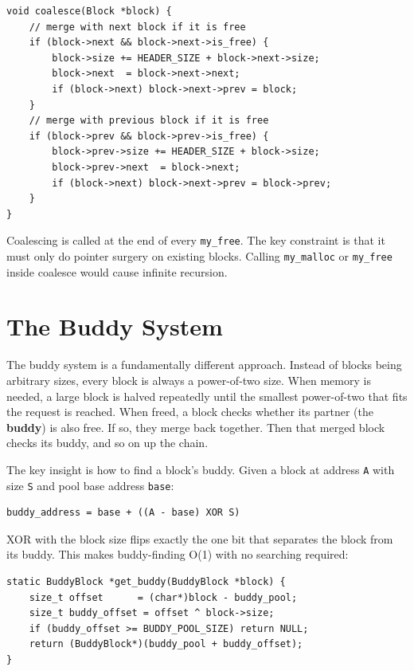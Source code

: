 \documentclass[12pt, a4paper]{report}
\begin{document}
\begin{lstlisting}
void coalesce(Block *block) {
    // merge with next block if it is free
    if (block->next && block->next->is_free) {
        block->size += HEADER_SIZE + block->next->size;
        block->next  = block->next->next;
        if (block->next) block->next->prev = block;
    }
    // merge with previous block if it is free
    if (block->prev && block->prev->is_free) {
        block->prev->size += HEADER_SIZE + block->size;
        block->prev->next  = block->next;
        if (block->next) block->next->prev = block->prev;
    }
}
\end{lstlisting}

Coalescing is called at the end of every \texttt{my\_free}. The key constraint
is that it must only do pointer surgery on existing blocks. Calling
\texttt{my\_malloc} or \texttt{my\_free} inside coalesce would cause infinite
recursion.

\section{The Buddy System}

The buddy system is a fundamentally different approach. Instead of blocks being
arbitrary sizes, every block is always a power-of-two size. When memory is
needed, a large block is halved repeatedly until the smallest power-of-two that
fits the request is reached. When freed, a block checks whether its partner (the
\textbf{buddy}) is also free. If so, they merge back together. Then that merged
block checks its buddy, and so on up the chain.

The key insight is how to find a block's buddy. Given a block at address
\texttt{A} with size \texttt{S} and pool base address \texttt{base}:

\begin{lstlisting}[style=shellstyle, numbers=none]
buddy_address = base + ((A - base) XOR S)
\end{lstlisting}

XOR with the block size flips exactly the one bit that separates the block from
its buddy. This makes buddy-finding O(1) with no searching required:

\begin{lstlisting}
static BuddyBlock *get_buddy(BuddyBlock *block) {
    size_t offset      = (char*)block - buddy_pool;
    size_t buddy_offset = offset ^ block->size;
    if (buddy_offset >= BUDDY_POOL_SIZE) return NULL;
    return (BuddyBlock*)(buddy_pool + buddy_offset);
}
\end{lstlisting}
\end{document}
